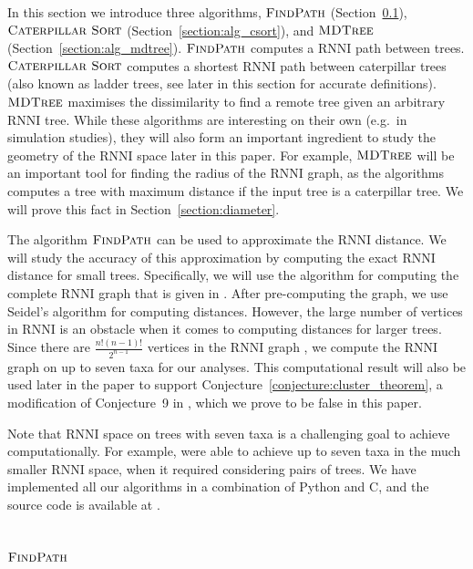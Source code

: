 \documentclass{amsart}
\newcommand{\rnni}{\mathrm{RNNI}}
\newcommand{\csort}{\textsc{Caterpillar Sort}}
\newcommand{\findpath}{\textsc{FindPath}}
\newcommand{\mdtree}{\textsc{MDTree}}
\begin{document}
In this section we introduce three algorithms, $\findpath$ (Section~\ref{section:alg_findpath}), $\csort$ (Section~\ref{section:alg_csort}), and $\mdtree$ (Section~\ref{section:alg_mdtree}).
$\findpath$ computes a $\rnni$ path between trees.
$\csort$ computes a shortest $\rnni$ path between caterpillar trees (also known as ladder trees, see later in this section for accurate definitions).
$\mdtree$ maximises the dissimilarity to find a remote tree given an arbitrary $\rnni$ tree.
While these algorithms are interesting on their own (e.g.\ in simulation studies), they will also form an important ingredient to study the geometry of the $\rnni$ space later in this paper.
For example, $\mdtree$ will be an important tool for finding the radius of the $\rnni$ graph, as the algorithms computes a tree with maximum distance if the input tree is a caterpillar tree.
We will prove this fact in Section~\ref{section:diameter}.

The algorithm $\findpath$ can be used to approximate the $\rnni$ distance.
We will study the accuracy of this approximation by computing the exact $\rnni$ distance for small trees.
Specifically, we will use the algorithm for computing the complete $\rnni$ graph that is given in \autocite[Section 3.3]{Gavryushkin2018-ol}.
After pre-computing the graph, we use Seidel's algorithm \autocite{seidel_all-pairs-shortest-path_1995} for computing distances.
However, the large number of vertices in $\rnni$ is an obstacle when it comes to computing distances for larger trees.
Since there are $\frac{n!(n-1)!}{2^{n-1}}$ vertices in the $\rnni$ graph \autocite{Gavryushkin2018-ol}, we compute the $\rnni$ graph on up to seven taxa for our analyses.
This computational result will also be used later in the paper to support Conjecture~\ref{conjecture:cluster_theorem}, a modification of Conjecture~9 in \autocite{Gavryushkin2018-ol}, which we prove to be false in this paper.

Note that $\rnni$ space on trees with seven taxa is a challenging goal to achieve computationally.
For example, \textcite{Whidden2016-kl} were able to achieve up to seven taxa in the much smaller $\rnni$ space, when it required considering pairs of trees.
We have implemented all our algorithms in a combination of Python and C, and the source code is available at \autocite{Collienne2019}.


\subsection{$\findpath$}
\label{section:alg_findpath}
\end{document}
